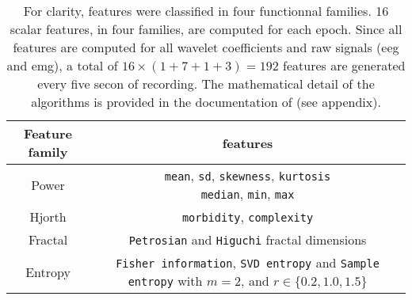 

\begin {table}[!h]
\begin{center}
\caption{
For clarity, features were classified in four functionnal families.
16 scalar features, in four families, are computed for each epoch.
Since all features are computed for all wavelet coefficients and raw signals (\gls{eeg} and \gls{emg}), a total of 
$16 \times (1+7 + 1 + 3) = 192$ features are generated every five secon of recording.
The mathematical detail of the algorithms is provided in the documentation of \pr{} (see appendix).
\label{tab:features}}

\small
\begin{tabular}{|c|c|}
  \hline
  Feature family & features\\
 \hline
 \hline
  Power & \specialcell{\texttt{mean}, \texttt{sd}, \texttt{skewness}, \texttt{kurtosis}\\\texttt{median}, \texttt{min}, \texttt{max}}\\
  \hline
  Hjorth & \texttt{morbidity}, \texttt{complexity}\\
  \hline
  Fractal & \texttt{Petrosian} and \texttt{Higuchi} fractal dimensions\\
  \hline
  Entropy & \specialcell{\texttt{Fisher information}, \texttt{SVD entropy}\\and \texttt{Sample entropy} with $m=2$, and $ r \in \{ 0.2, 1.0, 1.5\}$}\\
 \hline



\end{tabular}
\end{center}
\end{table}

